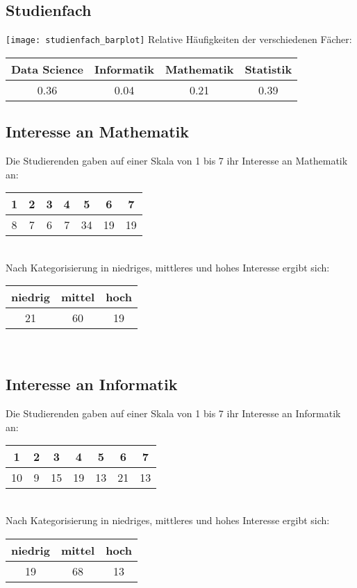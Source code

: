 \documentclass[paper=a4,                 %
               fontsize=12pt,            %
               parskip=half,             %
               ngerman,                 %
               ]{scrartcl}
\begin{document}
\subsection{Studienfach}
\texttt{[image: studienfach\_barplot]} \newline
Relative Häufigkeiten der verschiedenen Fächer: \\ \newline
\begin{tabular}{c|c|c|c}
Data Science & Informatik & Mathematik & Statistik \\
\hline
0.36 & 0.04 & 0.21 & 0.39 \\
\end{tabular}

\subsection{Interesse an Mathematik}
Die Studierenden gaben auf einer Skala von 1 bis 7 ihr Interesse an Mathematik an: \\ \newline
\begin{tabular}{c|c|c|c|c|c|c}
1 & 2 & 3 & 4 & 5 & 6 & 7 \\
\hline
8 & 7 & 6 & 7 & 34 & 19 & 19 \\
\end{tabular}
\newline \\
Nach Kategorisierung in niedriges, mittleres und hohes Interesse ergibt sich: \\ \newline
\begin{tabular}{c|c|c}
niedrig & mittel & hoch \\
\hline
21 & 60 & 19 \\
\end{tabular} 
\\


\subsection{Interesse an Informatik}
Die Studierenden gaben auf einer Skala von 1 bis 7 ihr Interesse an Informatik an: \\ \newline
\begin{tabular}{c|c|c|c|c|c|c}
1 & 2 & 3 & 4 & 5 & 6 & 7 \\
\hline
10 & 9 &15 &19& 13& 21& 13 \\
\end{tabular}
\newline \\
Nach Kategorisierung in niedriges, mittleres und hohes Interesse ergibt sich: \\ \newline
\begin{tabular}{c|c|c}
niedrig & mittel & hoch \\
\hline
19 & 68 & 13 \\
\end{tabular} 
\\
\end{document}
